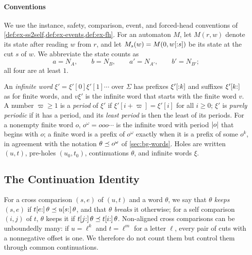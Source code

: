 \paragraph{Conventions}
We use the instance, safety, comparison, event, and forced-head conventions of
\cref{def:ex-ss2self,def:ex-events,def:ex-fh}. For an automaton $M$, let
$M(r,w)$ denote its state after reading $w$ from $r$, and let
$M_s(w)=M(0,w[{:}s])$ be its state at the cut $s$ of $w$. We abbreviate the
state counts as
\[
 a=N_A,\qquad b=N_B,\qquad a'=N_{A'},\qquad b'=N_{B'};
\]
all four are at least $1$.

An \emph{infinite word} $\xi'=\xi'[0]\xi'[1]\cdots$ over $\Sigma$ has prefixes
$\xi'[{:}k]$ and suffixes $\xi'[k{:}]$ as for finite words, and $v\xi'$ is the
infinite word that starts with the finite word $v$. A number $\varpi\ge1$ is a
\emph{period} of $\xi'$ if $\xi'[i+\varpi]=\xi'[i]$ for all $i\ge0$; $\xi'$ is \emph{purely
periodic} if it has a period, and its \emph{least period} is then the least of
its periods. For a nonempty finite word $o$, $o^\omega=ooo\cdots$ is the
infinite word with period $\lvert o\rvert$ that begins with $o$; a finite word is a
prefix of $o^\omega$ exactly when it is a prefix of some $o^k$, in agreement
with the notation $\theta\preceq o^\omega$ of \cref{sec:bg-words}. Holes are
written $(u,t)$, pre-holes $(u_0,t_0)$, continuations $\theta$, and infinite
words $\xi$.

\subsection{The Continuation Identity}\label{sec:nm-continuation}

For a cross comparison $(s,e)$ of $(u,t)$ and a word $\theta$, we say that
$\theta$ \emph{keeps} $(s,e)$ if $t[e{:}]\,\theta\preceq u[s{:}]\,\theta$, and
that $\theta$ \emph{breaks} it otherwise; for a self comparison $(i,j)$ of $t$,
$\theta$ keeps it if $t[j{:}]\,\theta\preceq t[i{:}]\,\theta$. Non-aligned cross
comparisons can be unboundedly many: if $u=\ell^k$ and $t=\ell^m$ for a letter
$\ell$, every pair of cuts with a nonnegative offset is one. We therefore do
not count them but control them through common continuations.

